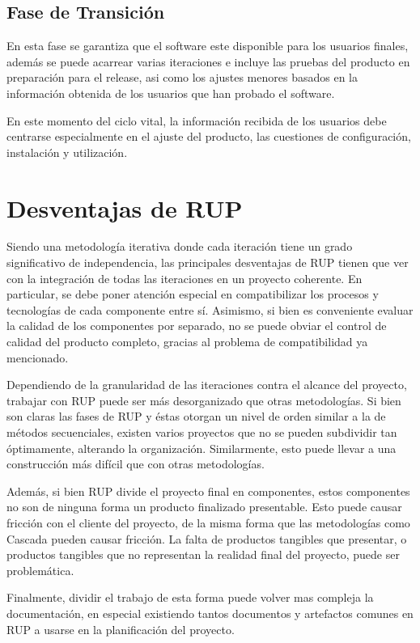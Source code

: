 \documentclass[spanish]{udpreport}
\begin{document}
\subsection{Fase de Transición}
En esta fase se garantiza que el software este disponible para los usuarios finales, además se puede acarrear varias iteraciones e incluye las pruebas del producto en preparación para el release, asi como los ajustes menores basados en la información obtenida de los usuarios que han probado el software.\par
En este momento del ciclo vital, la información recibida de los usuarios debe centrarse especialmente en el ajuste del producto, las cuestiones de configuración, instalación y utilización.

\section{Desventajas de RUP}
Siendo una metodología iterativa donde cada iteración tiene un grado significativo de independencia, las principales desventajas de RUP tienen que ver con la integración de todas las iteraciones en un proyecto coherente. En particular, se debe poner atención especial en compatibilizar los procesos y tecnologías de cada componente entre sí. Asimismo, si bien es conveniente evaluar la calidad de los componentes por separado, no se puede obviar el control de calidad del producto completo, gracias al problema de compatibilidad ya mencionado.\par
Dependiendo de la granularidad de las iteraciones contra el alcance del proyecto, trabajar con RUP puede ser más desorganizado que otras metodologías. Si bien son claras las fases de RUP y éstas otorgan un nivel de orden similar a la de métodos secuenciales, existen varios proyectos que no se pueden subdividir tan óptimamente, alterando la organización. Similarmente, esto puede llevar a una construcción más difícil que con otras metodologías.\par
Además, si bien RUP divide el proyecto final en componentes, estos componentes no son de ninguna forma un producto finalizado presentable. Esto puede causar fricción con el cliente del proyecto, de la misma forma que las metodologías como Cascada pueden causar fricción. La falta de productos tangibles que presentar, o productos tangibles que no representan la realidad final del proyecto, puede ser problemática.\par
Finalmente, dividir el trabajo de esta forma puede volver mas compleja la documentación, en especial existiendo tantos documentos y artefactos comunes en RUP a usarse en la planificación del proyecto.
\end{document}
